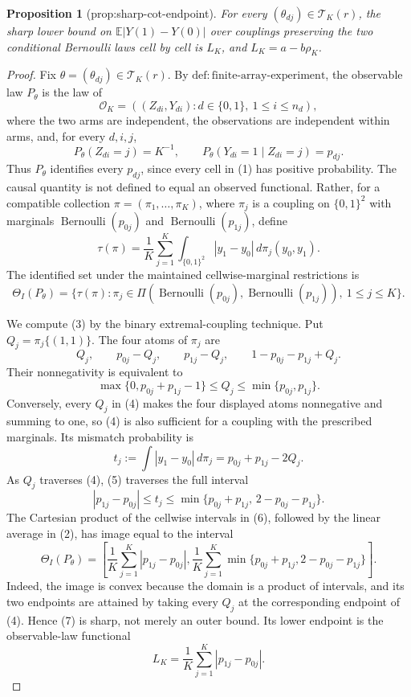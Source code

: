 \documentclass{article}
\newtheorem{proposition}{Proposition}
\begin{document}
\begin{proposition}[prop:sharp-cot-endpoint]\label{prop:sharp-cot-endpoint}
For every \((\theta_{dj})\in\mathcal T_K(r)\), the sharp lower bound on \(\mathbb E|Y(1)-Y(0)|\) over couplings preserving the two conditional Bernoulli laws cell by cell is \(L_K\), and \(L_K=a-b\rho_K\).
\end{proposition}
\begin{proof}
Fix \(\theta=(\theta_{dj})\in\mathcal T_K(r)\).  By \(\mathrm{def{:}finite\mbox{-}array\mbox{-}experiment}\), the observable law \(P_\theta\) is the law of
\[
 \mathcal O_K=((Z_{di},Y_{di}):d\in\{0,1\},\ 1\le i\le n_d),
\]
where the two arms are independent, the observations are independent within arms, and, for every \(d,i,j\),
\[
 P_\theta(Z_{di}=j)=K^{-1},\qquad
 P_\theta(Y_{di}=1\mid Z_{di}=j)=p_{dj}.
 \tag{1}
\]
Thus \(P_\theta\) identifies every \(p_{dj}\), since every cell in (1) has positive probability.  The causal quantity is not defined to equal an observed functional.  Rather, for a compatible collection \(\pi=(\pi_1,\ldots,\pi_K)\), where \(\pi_j\) is a coupling on \(\{0,1\}^2\) with marginals \(\operatorname{Bernoulli}(p_{0j})\) and \(\operatorname{Bernoulli}(p_{1j})\), define
\[
 \tau(\pi)=\frac1K\sum_{j=1}^K
 \int_{\{0,1\}^2}|y_1-y_0|\,d\pi_j(y_0,y_1).
 \tag{2}
\]
The identified set under the maintained cellwise-marginal restrictions is
\[
 \Theta_I(P_\theta)=\{\tau(\pi):\pi_j\in
 \Pi(\operatorname{Bernoulli}(p_{0j}),
      \operatorname{Bernoulli}(p_{1j})),\ 1\le j\le K\}.
 \tag{3}
\]

We compute (3) by the binary extremal-coupling technique.  Put
\(Q_j=\pi_j\{(1,1)\}\).  The four atoms of \(\pi_j\) are
\[
 Q_j,\qquad p_{0j}-Q_j,\qquad p_{1j}-Q_j,
 \qquad 1-p_{0j}-p_{1j}+Q_j.
\]
Their nonnegativity is equivalent to
\[
 \max\{0,p_{0j}+p_{1j}-1\}
 \le Q_j\le \min\{p_{0j},p_{1j}\}.                 \tag{4}
\]
Conversely, every \(Q_j\) in (4) makes the four displayed atoms nonnegative and summing to one, so (4) is also sufficient for a coupling with the prescribed marginals.  Its mismatch probability is
\[
 t_j:=\int |y_1-y_0|\,d\pi_j
 =p_{0j}+p_{1j}-2Q_j.                              \tag{5}
\]
As \(Q_j\) traverses (4), (5) traverses the full interval
\[
 |p_{1j}-p_{0j}|\le t_j\le
 \min\{p_{0j}+p_{1j},\,2-p_{0j}-p_{1j}\}.         \tag{6}
\]
The Cartesian product of the cellwise intervals in (6), followed by the linear average in (2), has image equal to the interval
\[
 \Theta_I(P_\theta)=
 \left[
  \frac1K\sum_{j=1}^K|p_{1j}-p_{0j}|,
  \frac1K\sum_{j=1}^K
  \min\{p_{0j}+p_{1j},2-p_{0j}-p_{1j}\}
 \right].                                         \tag{7}
\]
Indeed, the image is convex because the domain is a product of intervals, and its two endpoints are attained by taking every \(Q_j\) at the corresponding endpoint of (4).  Hence (7) is sharp, not merely an outer bound.  Its lower endpoint is the observable-law functional
\[
 L_K=\frac1K\sum_{j=1}^K|p_{1j}-p_{0j}|.          \tag{8}
\]


\end{proof}
\end{document}

